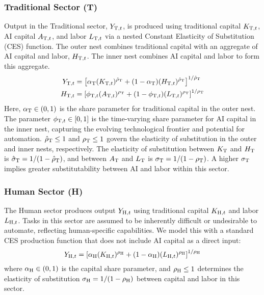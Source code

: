 \documentclass{article}
\newcommand{\sector}[1]{\textnormal{#1}}
\begin{document}
\subsubsection{Traditional Sector (T)}
Output in the Traditional sector, $Y_{\sector{T},t}$, is produced using traditional capital $K_{\sector{T},t}$, AI capital $A_{\sector{T},t}$, and labor $L_{\sector{T},t}$ via a nested Constant Elasticity of Substitution (CES) function. 
The outer nest combines traditional capital with an aggregate of AI capital and labor, $H_{\sector{T},t}$. 
The inner nest combines AI capital and labor to form this aggregate.
\begin{align}
Y_{\sector{T},t} &= \left[ \alpha_{\sector{T}} (K_{\sector{T},t})^{\hat{\rho}_{\sector{T}}} + (1-\alpha_{\sector{T}}) (H_{\sector{T},t})^{\hat{\rho}_{\sector{T}}} \right]^{1/\hat{\rho}_{\sector{T}}} \label{eq:prod_T_outer} \\
H_{\sector{T},t} &= \left[ \phi_{\sector{T},t} (A_{\sector{T},t})^{\rho_{\sector{T}}} + (1-\phi_{\sector{T},t}) (L_{\sector{T},t})^{\rho_{\sector{T}}} \right]^{1/\rho_{\sector{T}}} \label{eq:prod_T_inner}
\end{align}
Here, $\alpha_{\sector{T}} \in (0,1)$ is the share parameter for traditional capital in the outer nest. 
The parameter $\phi_{\sector{T},t} \in [0,1]$ is the time-varying share parameter for AI capital in the inner nest, capturing the evolving technological frontier and potential for automation. 
$\hat{\rho}_{\sector{T}} \leq 1$ and $\rho_{\sector{T}} \leq 1$ govern the elasticity of substitution in the outer and inner nests, respectively. 
The elasticity of substitution between $K_{\sector{T}}$ and $H_{\sector{T}}$ is $\hat{\sigma}_{\sector{T}} = 1/(1-\hat{\rho}_{\sector{T}})$, and between $A_{\sector{T}}$ and $L_{\sector{T}}$ is $\sigma_{\sector{T}} = 1/(1-\rho_{\sector{T}})$. 
A higher $\sigma_{\sector{T}}$ implies greater substitutability between AI and labor within this sector.

\subsubsection{Human Sector (H)}
The Human sector produces output $Y_{\sector{H},t}$ using traditional capital $K_{\sector{H},t}$ and labor $L_{\sector{H},t}$. 
Tasks in this sector are assumed to be inherently difficult or undesirable to automate, reflecting human-specific capabilities. 
We model this with a standard CES production function that does not include AI capital as a direct input:
\begin{equation}
Y_{\sector{H},t} = \left[ \alpha_{\sector{H}} (K_{\sector{H},t})^{\rho_{\sector{H}}} + (1-\alpha_{\sector{H}}) (L_{\sector{H},t})^{\rho_{\sector{H}}} \right]^{1/\rho_{\sector{H}}} \label{eq:prod_H}
\end{equation}
where $\alpha_{\sector{H}} \in (0,1)$ is the capital share parameter, and $\rho_{\sector{H}} \leq 1$ determines the elasticity of substitution $\sigma_{\sector{H}} = 1/(1-\rho_{\sector{H}})$ between capital and labor in this sector.
\end{document}

